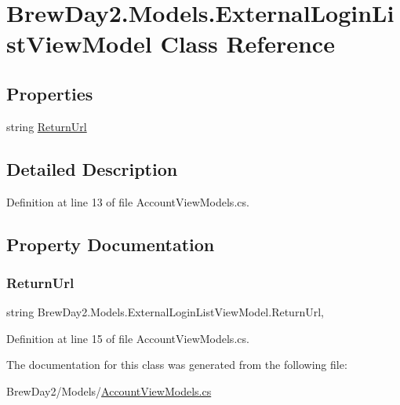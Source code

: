 \hypertarget{class_brew_day2_1_1_models_1_1_external_login_list_view_model}{}\section{Brew\+Day2.\+Models.\+External\+Login\+List\+View\+Model Class Reference}
\label{class_brew_day2_1_1_models_1_1_external_login_list_view_model}
\subsection*{Properties}
\begin{DoxyCompactItemize}
\item 
string \mbox{\hyperlink{class_brew_day2_1_1_models_1_1_external_login_list_view_model_a4cb318fc10e9d64b7880e6bdcca1b07e}{Return\+Url}}
\end{DoxyCompactItemize}


\subsection{Detailed Description}


Definition at line 13 of file Account\+View\+Models.\+cs.



\subsection{Property Documentation}
\mbox{\label{class_brew_day2_1_1_models_1_1_external_login_list_view_model_a4cb318fc10e9d64b7880e6bdcca1b07e}} 
\subsubsection{\texorpdfstring{Return\+Url}{ReturnUrl}}
{\footnotesize\ttfamily string Brew\+Day2.\+Models.\+External\+Login\+List\+View\+Model.\+Return\+Url\hspace{0.3cm}{\ttfamily [get]}, {\ttfamily [set]}}



Definition at line 15 of file Account\+View\+Models.\+cs.



The documentation for this class was generated from the following file\+:\begin{DoxyCompactItemize}
\item 
Brew\+Day2/\+Models/\mbox{\hyperlink{_account_view_models_8cs}{Account\+View\+Models.\+cs}}\end{DoxyCompactItemize}
